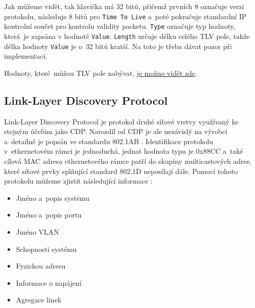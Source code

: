 \documentclass[a4paper,12pt]{article}
\begin{document}
				Jak můžeme vidět, tak hlavička má 32 bitů, přičemž prvních 8 označuje verzi protokolu, následuje 8 bitů pro \texttt{Time To Live} a~poté pokračuje standardní IP kontrolní součet pro kontrolu validity packetu. \texttt{Type} označuje typ hodnoty, která~je zapsána v hodnotě \texttt{Value}. \texttt{Length} určuje délku celého TLV pole, takže délka hodnoty \texttt{Value} je o~32 bitů kratší. Na toto je třeba dávat pozor při implementaci.
				
				\begin{table}[h]
					\begin{center}
						\caption{Struktura pole TLV}\label{cdp:tlvFormat}
						
						
						
					\end{center}
				\end{table}
				
				Hodnoty, které~můžou TLV pole nabývat, \href{http://www.cs.technion.ac.il/Courses/Computer-Networks-Lab/projects/spring2003/cdp2/web\_cdp2/web\_cdp2/cdp2\_report.htm}{je možno vidět zde}.
				
				
				
		\subsection{Link-Layer Discovery Protocol}\label{lldp}
			Link-Layer Discovery Protocol je protokol druhé síťové vrstvy využívaný ke stejným účelům jako CDP. Narozdíl od CDP je ale nezávislý na výrobci a~detailně je popsán ve standardu 802.1AB \cite{802.1AB}. Identifikace protokolu v~ethernetovém rámci je jednoduchá, jednat hodnota typu je 0x88CC a~také cílová MAC adresa ethernetového rámce patří do skupiny multicastových adres, které síťové prvky splňující standard 802.1D neposílají dále. Pomocí tohoto protokolu můžeme zjistit následující informace \cite{wiki:lldp}:
			
			\begin{itemize}
				\item Jméno a~popis systému
				\item Jméno a~popis portu
				\item Jméno VLAN
				\item Schopnosti systému
				\item Fyzickou adresu
				\item Informace o napájení
				\item Agregace linek
			\end{itemize}
			
\end{document}
